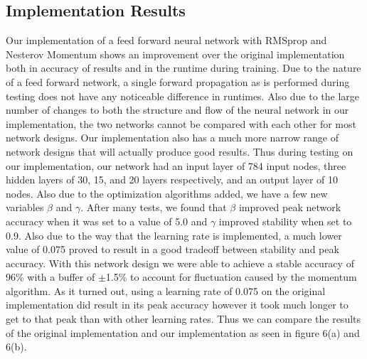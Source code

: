 \documentclass[12pt]{article}
\theoremstyle{definition}
\theoremstyle{plain}
\begin{document}
\subsection{Implementation Results}
Our implementation of a feed forward neural network with RMSprop and Nesterov Momentum shows an improvement over the original implementation both in accuracy of results and in the runtime during training. Due to the nature of a feed forward network, a single forward propagation as is performed during testing does not have any noticeable difference in runtimes. Also due to the large number of changes to both the structure and flow of the neural network in our implementation, the two networks cannot be compared with each other for most network designs. Our implementation also has a much more narrow range of network designs that will actually produce good results. Thus during testing on our implementation, our network had an input layer of 784 input nodes, three hidden layers of 30, 15, and 20 layers respectively, and an output layer of 10 nodes. Also due to the optimization algorithms added, we have a few new variables $\beta$ and $\gamma$. After many tests, we found that $\beta$ improved peak network accuracy when it was set to a value of 5.0 and $\gamma$ improved stability when set to 0.9. Also due to the way that the learning rate is implemented, a much lower value of 0.075 proved to result in a good tradeoff between stability and peak accuracy. With this network design we were able to achieve a stable accuracy of 96\% with a buffer of $\pm$1.5\% to account for fluctuation caused by the momentum algorithm. As it turned out, using a learning rate of 0.075 on the original implementation did result in its peak accuracy however it took much longer to get to that peak than with other learning rates. Thus we can compare the results of the original implementation and our implementation as seen in figure 6(a) and 6(b). 
\end{document}
